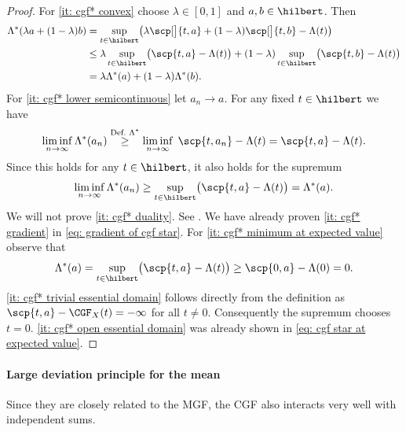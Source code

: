 \begin{proof}
    For \ref{it: cgf* convex} choose \(\lambda\in [0,1]\) and \(a, b\in \hilbert\). Then
    \[\begin{aligned}
        \Lambda^*(\lambda a + (1-\lambda) b)
        &= \sup_{t\in \hilbert} \bigl(\lambda \scp[\big]{t, a} + (1-\lambda) \scp[\big]{t, b} - \Lambda(t)\bigr)
        \\
        &\le \lambda \sup_{t\in \hilbert} \bigl(\scp{t, a} - \Lambda(t)\bigr)
        + (1-\lambda) \sup_{t\in \hilbert} \bigl(\scp{t, b} - \Lambda(t)\bigr)
        \\
        &= \lambda \Lambda^*(a) + (1-\lambda) \Lambda^*(b).
    \end{aligned}
    \]
    For \ref{it: cgf* lower semicontinuous} let \(a_n \to a\). For any fixed \(t\in \hilbert\) we have
    \[
        \liminf_{n\to \infty} \Lambda^*(a_n)
        \overset{\text{Def.~}\Lambda^*}\ge \liminf_{n\to \infty}\; \scp{t, a_n} - \Lambda(t)
        = \scp{t, a} - \Lambda(t).
    \]
    Since this holds for any \(t\in \hilbert\), it also holds for the supremum
    \[
        \liminf_{n\to \infty} \Lambda^*(a_n) \ge \sup_{t\in \hilbert} \bigl(\scp{t, a} - \Lambda(t)\bigr) = \Lambda^*(a).
    \]
    We will not prove \ref{it: cgf* duality}. See . We have already proven
    \ref{it: cgf* gradient} in \eqref{eq: gradient of cgf star}. For \ref{it: cgf* minimum at expected value} observe that
    \[
        \Lambda^*(a) = \sup_{t\in \hilbert} \bigl(\scp{t, a} - \Lambda(t)\bigr)
        \ge \scp{0, a} - \Lambda(0) = 0.
    \]
    \ref{it: cgf* trivial essential domain} follows directly from the definition
    as \(\scp{t, a} - \CGF_X(t) = -\infty\) for all \(t \neq 0\). Consequently
    the supremum chooses \(t=0\).  \ref{it: cgf* open essential domain} was already
    shown in \eqref{eq: cgf star at expected value}.
\end{proof}

\paragraph*{Large deviation principle for the mean}

Since they are closely related to the MGF, the CGF also interacts very well with
independent sums.

